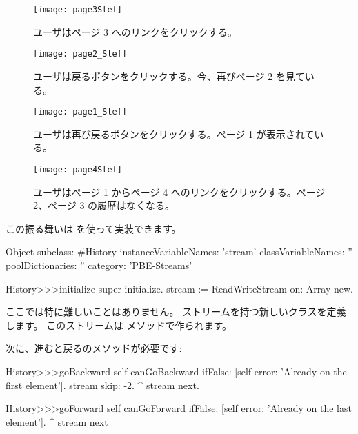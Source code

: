 \documentclass[a4paper,10pt,twoside]{book}
\begin{document}
\begin{figure}[!ht]
\centerline{\texttt{[image: page3Stef]}}
\caption{ユーザはページ 3 へのリンクをクリックする。}
\vspace{.2in}
\end{figure}

\begin{figure}[!ht]
\centerline{\texttt{[image: page2\_Stef]}}
\caption{ユーザは戻るボタンをクリックする。今、再びページ 2 を見ている。}
\vspace{.2in}
\end{figure}

\begin{figure}[!ht]
\centerline{\texttt{[image: page1\_Stef]}}
\caption{ユーザは再び戻るボタンをクリックする。ページ 1 が表示されている。}
\vspace{.2in}
\end{figure}

\begin{figure}[!ht]
\centerline{\texttt{[image: page4Stef]}}
\caption{ユーザはページ 1 からページ 4 へのリンクをクリックする。ページ 2、ページ 3 の履歴はなくなる。}
\vspace{.2in}
\end{figure}

この振る舞いは  を使って実装できます。

\begin{code}{}
Object subclass: #History
  instanceVariableNames: 'stream'
  classVariableNames: ''
  poolDictionaries: ''
  category: 'PBE-Streams'

History>>>initialize
    super initialize.
    stream := ReadWriteStream on: Array new.
\end{code}

ここでは特に難しいことはありません。
ストリームを持つ新しいクラスを定義します。
このストリームは  メソッドで作られます。

次に、進むと戻るのメソッドが必要です:

\begin{code}{}
History>>>goBackward
  self canGoBackward ifFalse: [self error: 'Already on the first element'].
  stream skip: -2.
  ^ stream next.

History>>>goForward
  self canGoForward ifFalse: [self error: 'Already on the last element'].
  ^ stream next
\end{code}
\end{document}
